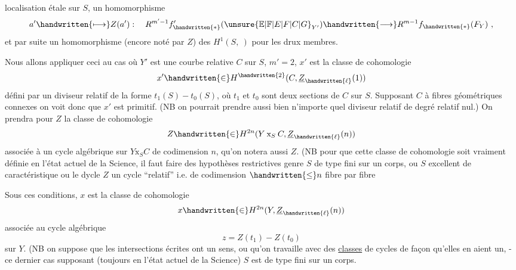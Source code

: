 localisation étale sur $S$, un homomorphisme
\[
a'\handwritten{\longmapsto}Z(a'):\quad R^{m'-1}f'_{\handwritten{*}}({\unsure{\mathbb{E}|\mathbb{F}|E|F|C|G}}_{Y'})\handwritten{\longrightarrow}R^{m-1}f_{\handwritten{*}}(F_Y)\ ,
\]
et par suite un homomorphisme (encore noté par $Z$) des $H^1(S,\ )$ pour les drux membres.

Nous allons appliquer ceci au cas où $Y'$ est une courbe relative $C$ sur $S$, $m'=2$, $x'$ est la classe de cohomologie
\[
x'\handwritten{\in}H^{\handwritten{2}}(C,\underline{Z}_{\handwritten{\ell}}(1))
\]
défini par un diviseur relatif de la forme $t_1(S)-t_0(S)$, où $t_1$ et $t_0$ sont deux sections de $C$ sur $S$. Supposant $C$ à fibres géométriques connexes on voit donc que $x'$ est primitif. (NB on pourrait prendre aussi bien n'importe quel diviseur relatif de degré relatif nul.) On prendra pour $Z$ la classe de cohomologie
\[
Z\handwritten{\in}H^{2n}(Y\mathbin{\mathrm{x}}_S C,\underline{Z}_{\handwritten{\ell}}(n))
\]
associée à un cycle algébrique sur $Y\mathbin{\mathrm{x}}_S C$ de codimension $n$, qu'on notera aussi $Z$. (NB pour que cette classe de cohomologie soit vraiment définie en l'état actuel de la Science, il faut faire des hypothèses restrictives genre $S$ de type fini sur un corps, ou $S$ excellent de caractéristique  ou le dycle $Z$ un cycle ``relatif'' i.e. de codimension $\handwritten{\leq}n$ fibre par fibre

Sous ces conditions, $x$ est la classe de cohomologie
\[
x\handwritten{\in}H^{2n}(Y,\underline{Z}_{\handwritten{\ell}}(n))
\]
associée au cycle algébrique
\[
z=Z(t_1)-Z(t_0)
\]
sur $Y$. (NB on suppose que les intersections écrites ont un sens, ou qu'on travaille avec des \uline{classes} de cycles de façon qu'elles en aient un, - ce dernier cas supposant (toujours en l'état actuel de la Science)  $S$ est de type fini sur un corps.
